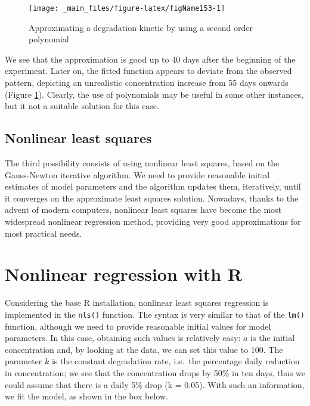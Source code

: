 \documentclass[a4paper,12pt,oneside]{book}
\begin{document}
\begin{figure}

{\centering \texttt{[image: \_main\_files/figure-latex/figName153-1]} 

}

\caption{Approximating a degradation kinetic by using a second order polynomial}\label{fig:figName153}
\end{figure}

We see that the approximation is good up to 40 days after the beginning of the experiment. Later on, the fitted function appears to deviate from the observed pattern, depicting an unrealistic concentration increase from 55 days onwards (Figure \ref{fig:figName153}). Clearly, the use of polynomials may be useful in some other instances, but it not a suitable solution for this case.

\hypertarget{nonlinear-least-squares}{%
\subsection{Nonlinear least squares}\label{nonlinear-least-squares}}

The third possibility consists of using nonlinear least squares, based on the Gauss-Newton iterative algorithm. We need to provide reasonable initial estimates of model parameters and the algorithm updates them, iteratively, until it converges on the approximate least squares solution. Nowadays, thanks to the advent of modern computers, nonlinear least squares have become the most widespread nonlinear regression method, providing very good approximations for most practical needs.

\hypertarget{nonlinear-regression-with-r}{%
\section{Nonlinear regression with R}\label{nonlinear-regression-with-r}}

Considering the base R installation, nonlinear least squares regression is implemented in the \texttt{nls()} function. The syntax is very similar to that of the \texttt{lm()} function, although we need to provide reasonable initial values for model parameters. In this case, obtaining such values is relatively easy: \(a\) is the initial concentration and, by looking at the data, we can set this value to 100. The parameter \(k\) is the constant degradation rate, i.e.~the percentage daily reduction in concentration; we see that the concentration drops by 50\% in ten days, thus we could assume that there is a daily 5\% drop (k = 0.05). With such an information, we fit the model, as shown in the box below.
\end{document}
